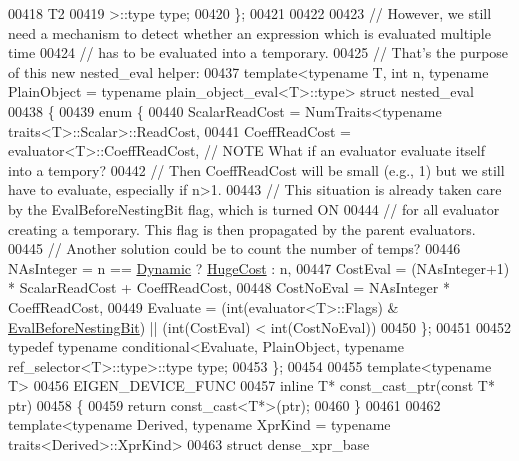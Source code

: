 \begin{DoxyCode}
{00418     T2
00419   >::type type;
00420 \};
00421 
00422 
00423 \textcolor{comment}{// However, we still need a mechanism to detect whether an expression which is evaluated multiple time}
00424 \textcolor{comment}{// has to be evaluated into a temporary.}
00425 \textcolor{comment}{// That's the purpose of this new nested\_eval helper:}
00437 \textcolor{comment}{}template<typename T, int n, typename PlainObject = typename plain\_object\_eval<T>::type> \textcolor{keyword}{struct }nested\_eval
00438 \{
00439   \textcolor{keyword}{enum} \{
00440     ScalarReadCost = NumTraits<typename traits<T>::Scalar>::ReadCost,
00441     CoeffReadCost = evaluator<T>::CoeffReadCost,  \textcolor{comment}{// NOTE What if an evaluator evaluate itself into a
       tempory?}
00442                                                   \textcolor{comment}{//      Then CoeffReadCost will be small (e.g., 1) but we
       still have to evaluate, especially if n>1.}
00443                                                   \textcolor{comment}{//      This situation is already taken care by the
       EvalBeforeNestingBit flag, which is turned ON}
00444                                                   \textcolor{comment}{//      for all evaluator creating a temporary. This flag
       is then propagated by the parent evaluators.}
00445                                                   \textcolor{comment}{//      Another solution could be to count the number of
       temps?}
00446     NAsInteger = n == \hyperlink{namespace_eigen_ad81fa7195215a0ce30017dfac309f0b2}{Dynamic} ? \hyperlink{namespace_eigen_a3163430a1c13173faffde69016b48aaf}{HugeCost} : n,
00447     CostEval   = (NAsInteger+1) * ScalarReadCost + CoeffReadCost,
00448     CostNoEval = NAsInteger * CoeffReadCost,
00449     Evaluate = (\textcolor{keywordtype}{int}(evaluator<T>::Flags) & \hyperlink{group__flags_gaa34e83bae46a8eeae4e69ebe3aaecbed}{EvalBeforeNestingBit}) || (\textcolor{keywordtype}{int}(CostEval) < 
      int(CostNoEval))
00450   \};
00451 
00452   \textcolor{keyword}{typedef} \textcolor{keyword}{typename} conditional<Evaluate, PlainObject, typename ref\_selector<T>::type>::type type;
00453 \};
00454 
00455 \textcolor{keyword}{template}<\textcolor{keyword}{typename} T>
00456 EIGEN\_DEVICE\_FUNC
00457 \textcolor{keyword}{inline} T* const\_cast\_ptr(\textcolor{keyword}{const} T* ptr)
00458 \{
00459   \textcolor{keywordflow}{return} \textcolor{keyword}{const\_cast<}T*\textcolor{keyword}{>}(ptr);
00460 \}
00461 
00462 template<typename Derived, typename XprKind = typename traits<Derived>::XprKind>
00463 \textcolor{keyword}{struct }dense\_xpr\_base
}
\end{DoxyCode}
